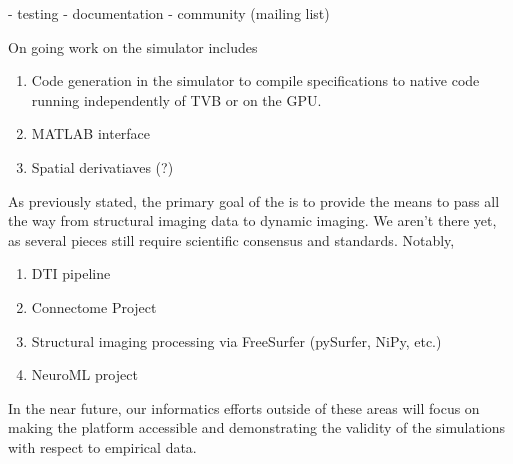 
- testing
- documentation
- community (mailing list)

On going work on the simulator includes

\begin{enumerate}
	\item Code generation in the simulator to compile specifications to native
		code running independently of TVB or on the GPU.
	\item MATLAB interface
	\item Spatial derivatiaves (?) 
\end{enumerate}

As previously stated, the primary goal of the \TVB is to provide the means
to pass all the way from structural imaging data to dynamic imaging. We
aren't there yet, as several pieces still require scientific consensus 
and standards. Notably, 

\begin{enumerate}
	\item DTI pipeline
	\item Connectome Project
	\item Structural imaging processing via FreeSurfer (pySurfer, NiPy, etc.)
	\item NeuroML project	
\end{enumerate}


In the near future, our informatics efforts outside of these areas will
focus on making the platform accessible and demonstrating the validity
of the simulations with respect to empirical data.

